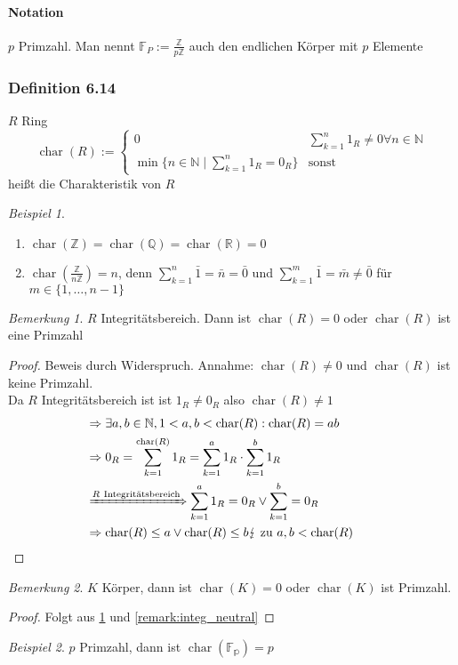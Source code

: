 \documentclass[a4paper]{scrartcl}
\DeclareMathOperator{\Forall}{\forall}
\DeclareMathOperator{\cha}{char}
\theoremstyle{definition}
\theoremstyle{plain}
\theoremstyle{plain}
\theoremstyle{remark}
\newtheorem{remark}{Bemerkung}
\theoremstyle{remark}
\theoremstyle{remark}
\newtheorem{ex}{Beispiel}
\begin{document}
\paragraph{Notation}
\label{sec-3-3-4-2}
$p$ Primzahl. Man nennt $\mathbb{F}_P := \frac{\mathbb{Z}}{p\mathbb{Z}}$ auch den endlichen Körper mit $p$ Elemente
\subsubsection{Definition 6.14}
\label{sec-3-3-5}
$R$ Ring
\[\cha(R):=\begin{cases} 0 & \sum_{k = 1}^n 1_R \neq 0 \Forall n\in\mathbb{N} \\ \min\{n\in\mathbb{N}\mid \sum_{k = 1}^n 1_R = 0_R\} & \text{sonst}\end{cases}\]
heißt die Charakteristik von $R$
\begin{ex} \mbox{}
\begin{enumerate}
\item $\cha(\mathbb{Z}) = \cha(\mathbb{Q}) = \cha(\mathbb{R}) = 0$
\item $\cha(\frac{\mathbb{Z}}{n\mathbb{Z}}) = n$, denn $\sum_{k = 1}^n \bar 1 = \bar n = \bar 0$ und $\sum_{k = 1}^m \bar 1 = \bar m \neq \bar 0$ für $m\in\{1,\ldots,n - 1\}$
\end{enumerate}
\end{ex}
\begin{remark}
\label{remark:cha_prim}
$R$ Integritätsbereich. Dann ist $\cha(R) = 0$ oder $\cha(R)$ ist eine Primzahl
\end{remark}
\begin{proof}
Beweis durch Widerspruch. Annahme: $\cha(R) \neq 0$ und $\cha(R)$ ist keine Primzahl. \\
Da $R$ Integritätsbereich ist ist $1_R \neq 0_R$ also $\cha(R) \neq 1$
\begin{align*}
&\Rightarrow \exists a,b\in\mathbb{N}, 1 < a,b < \cha(R): \cha(R) = a b \\
&\Rightarrow 0_R = \sum_{k = 1}^{\cha(R)} 1_R = \sum_{k = 1}^a 1_R \cdot \sum_{k = 1}^b 1_R \\
&\xRightarrow{R~\text{Integritätsbereich}} \sum_{k = 1}^a 1_R = 0_R \vee \sum_{k = 1}^b = 0_R \\
&\Rightarrow \cha(R) \leq a \vee \cha(R)\leq b \lightning~\text{zu}~ a,b < \cha(R) \tag*{\qedhere}
\end{align*}
\end{proof}
\begin{remark}
$K$ Körper, dann ist $\cha(K) = 0$ oder $\cha(K)$ ist Primzahl.
\end{remark}
\begin{proof}
Folgt aus \ref{remark:cha_prim} und \ref{remark:integ_neutral}
\end{proof}
\begin{ex}
$p$ Primzahl, dann ist $\cha(\mathbb{F_p}) = p$
\end{ex}
\end{document}
